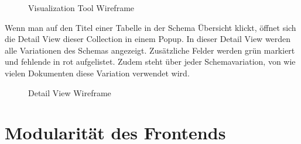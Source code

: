 \begin{figure}[H]
    \caption{Visualization Tool Wireframe}
    \label{fig:wireframe_vis_tool}
\end{figure}

Wenn man auf den Titel einer Tabelle in der Schema Übersicht klickt, öffnet sich die Detail View dieser Collection in einem Popup.
In dieser Detail View werden alle Variationen des Schemas angezeigt.
Zusätzliche Felder werden grün markiert und fehlende in rot aufgelistet.
Zudem steht über jeder Schemavariation, von wie vielen Dokumenten diese Variation verwendet wird.

\begin{figure}[H]
    \caption{Detail View Wireframe}
    \label{fig:wireframe_detail_view}
\end{figure}

\section{Modularität des Frontends}
\label{sec:mod_frontend}

